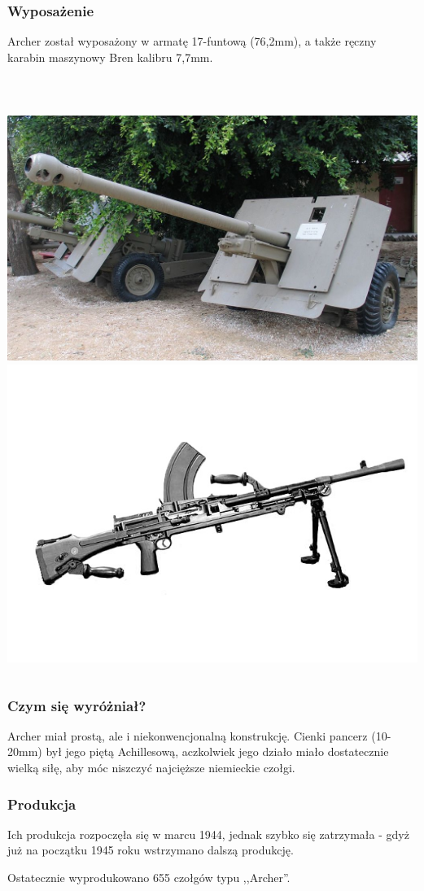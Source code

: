 \documentclass[]{beamer}
\begin{document}
\begin{frame}
\frametitle{Wyposażenie}
Archer został wyposażony w armatę 17-funtową (76,2mm), a także ręczny karabin maszynowy Bren kalibru 7,7mm.

\par \ 
\begin{columns}
\includegraphics[scale=0.3]{dzialo.jpg}
\column{0.3\textwidth}
\includegraphics[scale=1.31]{Bren.jpg}
\end{columns}
\end{frame}

\begin{frame}
\frametitle{Czym się wyróżniał?}
Archer miał prostą, ale i niekonwencjonalną konstrukcję. Cienki pancerz (10-20mm) był jego piętą Achillesową, aczkolwiek jego działo miało dostatecznie wielką siłę, aby móc niszczyć najcięższe niemieckie czołgi.
\end{frame}
\begin{frame}
\frametitle{Produkcja}
Ich produkcja rozpoczęła się w marcu 1944, jednak szybko się zatrzymała \pause - gdyż już na początku 1945 roku wstrzymano dalszą produkcję. \pause

Ostatecznie wyprodukowano 655 czołgów typu ,,Archer''.
\end{frame}
\end{document}
